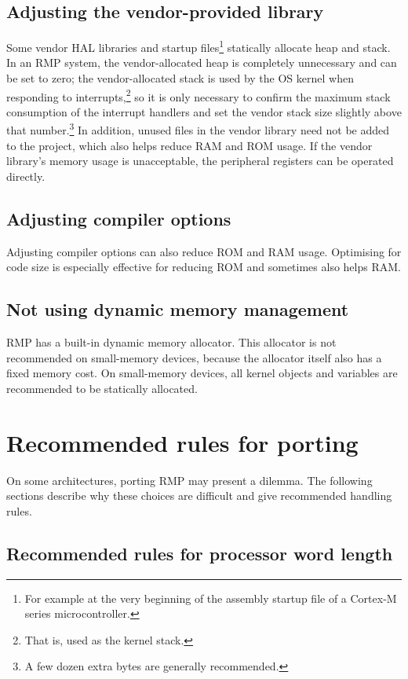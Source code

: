 \subsection{Adjusting the vendor-provided library}

Some vendor HAL libraries and startup files\footnote{For example at the very beginning of the assembly startup file of a Cortex-M series microcontroller.} statically allocate heap and stack.
In an RMP system, the vendor-allocated heap is completely unnecessary and can be set to zero; the vendor-allocated stack is used by the OS kernel when responding to interrupts,\footnote{That is, used as the kernel stack.} so it is only necessary to confirm the maximum stack consumption of the interrupt handlers and set the vendor stack size slightly above that number.\footnote{A few dozen extra bytes are generally recommended.}
In addition, unused files in the vendor library need not be added to the project, which also helps reduce RAM and ROM usage.
If the vendor library's memory usage is unacceptable, the peripheral registers can be operated directly.

\subsection{Adjusting compiler options}

Adjusting compiler options can also reduce ROM and RAM usage.
Optimising for code size is especially effective for reducing ROM and sometimes also helps RAM.

\subsection{Not using dynamic memory management}

RMP has a built-in dynamic memory allocator.
This allocator is not recommended on small-memory devices, because the allocator itself also has a fixed memory cost.
On small-memory devices, all kernel objects and variables are recommended to be statically allocated.

\section{Recommended rules for porting}

On some architectures, porting RMP may present a dilemma.
The following sections describe why these choices are difficult and give recommended handling rules.

\subsection{Recommended rules for processor word length}

